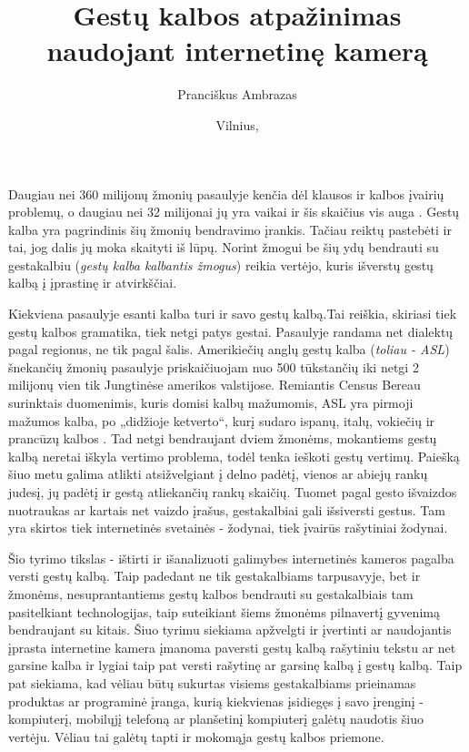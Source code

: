 \documentclass{VUMIFInfKursinis}
\title{Gestų kalbos atpažinimas naudojant internetinę kamerą}
\author{Pranciškus Ambrazas}
\date{Vilnius, \the\year}
\begin{document}
\maketitle

\tableofcontents

Daugiau nei 360 milijonų žmonių pasaulyje kenčia dėl klausos ir kalbos įvairių problemų, o daugiau nei 32 milijonai jų yra vaikai ir šis skaičius vis auga \cite{WhoInt}. Gestų kalba yra pagrindinis šių žmonių bendravimo įrankis. Tačiau reiktų pastebėti ir tai, jog dalis jų moka skaityti iš lūpų. Norint žmogui be šių ydų bendrauti su gestakalbiu (\textit{gestų kalba kalbantis žmogus}) reikia vertėjo, kuris išverstų gestų kalbą į įprastinę ir atvirkščiai.

Kiekviena pasaulyje esanti kalba turi ir savo gestų kalbą.Tai reiškia, skiriasi tiek gestų kalbos gramatika, tiek netgi patys gestai. Pasaulyje randama net dialektų pagal regionus, ne tik pagal šalis. Amerikiečių anglų gestų kalba (\textit{toliau - ASL}) šnekančių žmonių pasaulyje priskaičiuojam nuo 500 tūkstančių iki netgi 2 milijonų vien tik Jungtinėse amerikos valstijose. Remiantis Census Bereau surinktais duomenimis, kuris domisi kalbų mažumomis, ASL yra pirmoji mažumos kalba, po „didžioje ketverto“, kurį sudaro ispanų, italų, vokiečių ir prancūzų kalbos \cite{GUL}. Tad netgi bendraujant dviem žmonėms, mokantiems gestų kalbą neretai iškyla vertimo problema, todėl tenka ieškoti gestų vertimų. Paiešką šiuo metu galima atlikti atsižvelgiant į delno padėtį, vienos ar abiejų rankų judesį, jų padėtį ir gestą atliekančių rankų skaičių. Tuomet pagal gesto išvaizdos nuotraukas ar kartais net vaizdo įrašus, gestakalbiai gali išsiversti gestus. Tam yra skirtos tiek internetinės svetainės - žodynai, tiek įvairūs rašytiniai žodynai.

Šio tyrimo tikslas - ištirti ir išanalizuoti galimybes internetinės kameros pagalba versti gestų kalbą. Taip padedant ne tik gestakalbiams tarpusavyje, bet ir žmonėms, nesuprantantiems gestų kalbos bendrauti su gestakalbiais tam pasitelkiant technologijas, taip suteikiant šiems žmonėms pilnavertį gyvenimą bendraujant su kitais. Šiuo tyrimu siekiama apžvelgti ir įvertinti ar naudojantis įprasta internetine kamera įmanoma paversti gestų kalbą rašytiniu tekstu ar net garsine kalba ir lygiai taip pat versti rašytinę ar garsinę kalbą į gestų kalbą. Taip pat siekiama, kad vėliau būtų sukurtas visiems gestakalbiams prieinamas produktas ar programinė įranga, kurią kiekvienas įsidiegęs į savo įrenginį - kompiuterį, mobilųjį telefoną ar planšetinį kompiuterį galėtų naudotis šiuo vertėju. Vėliau tai galėtų tapti ir mokomąja gestų kalbos priemone. 
\end{document}
